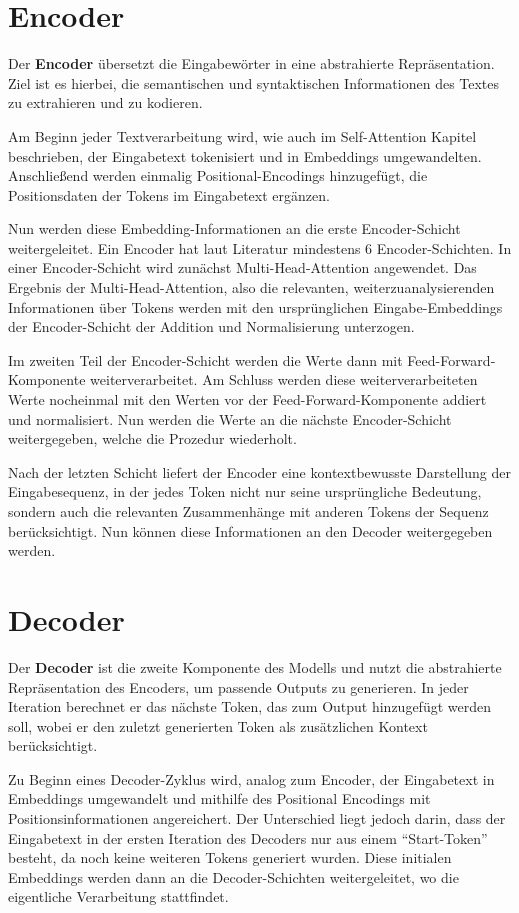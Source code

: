 \section{Encoder}

Der \textbf{Encoder} übersetzt die Eingabewörter in eine abstrahierte Repräsentation.  
Ziel ist es hierbei, die semantischen und syntaktischen Informationen des Textes zu extrahieren und zu kodieren.  

Am Beginn jeder Textverarbeitung wird, wie auch im  Self-Attention Kapitel beschrieben, der Eingabetext tokenisiert und in Embeddings umgewandelten.
Anschließend werden einmalig Positional-Encodings hinzugefügt, die Positionsdaten der Tokens im Eingabetext ergänzen.

Nun werden diese Embedding-Informationen an die erste Encoder-Schicht weitergeleitet.
Ein Encoder hat laut Literatur mindestens 6 Encoder-Schichten.
In einer Encoder-Schicht wird zunächst Multi-Head-Attention angewendet.
Das Ergebnis der Multi-Head-Attention, also die relevanten, weiterzuanalysierenden Informationen über Tokens werden mit den ursprünglichen Eingabe-Embeddings der Encoder-Schicht der Addition und Normalisierung unterzogen.

Im zweiten Teil der Encoder-Schicht werden die Werte dann mit Feed-Forward-Komponente weiterverarbeitet.
Am Schluss werden diese weiterverarbeiteten Werte nocheinmal mit den Werten vor der Feed-Forward-Komponente addiert und normalisiert. 
Nun werden die Werte an die nächste Encoder-Schicht weitergegeben, welche die Prozedur wiederholt.

Nach der letzten Schicht liefert der Encoder eine kontextbewusste Darstellung der Eingabesequenz, in der jedes Token nicht nur seine ursprüngliche Bedeutung, sondern auch die relevanten Zusammenhänge mit anderen Tokens der Sequenz berücksichtigt.
Nun können diese Informationen an den Decoder weitergegeben werden.

\section{Decoder}

Der \textbf{Decoder} ist die zweite Komponente des Modells und nutzt die abstrahierte Repräsentation des Encoders, um passende Outputs zu generieren. 
In jeder Iteration berechnet er das nächste Token, das zum Output hinzugefügt werden soll, wobei er den zuletzt generierten Token als zusätzlichen Kontext berücksichtigt.

Zu Beginn eines Decoder-Zyklus wird, analog zum Encoder, der Eingabetext in Embeddings umgewandelt und mithilfe des Positional Encodings mit Positionsinformationen angereichert. 
Der Unterschied liegt jedoch darin, dass der Eingabetext in der ersten Iteration des Decoders nur aus einem \enquote{Start-Token} besteht, da noch keine weiteren Tokens generiert wurden. 
Diese initialen Embeddings werden dann an die Decoder-Schichten weitergeleitet, wo die eigentliche Verarbeitung stattfindet.


